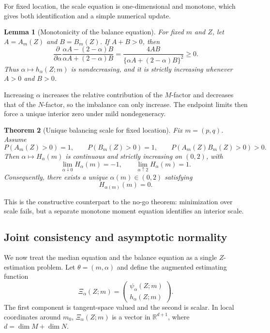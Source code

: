 \documentclass[11pt]{article}
\newtheorem{theorem}{Theorem}
\newtheorem{lemma}[theorem]{Lemma}
\newcommand{\R}{\mathbb R}
\newcommand{\1}{\mathbf{1}}
\begin{document}
For fixed location, the scale equation is one-dimensional and monotone, which
gives both identification and a simple numerical update.

\begin{lemma}[Monotonicity of the balance equation]\label{lem:h-monotone}
For fixed $m$ and $Z$, let $A=A_m(Z)$ and $B=B_m(Z)$.  If $A+B>0$, then
\begin{equation}\label{eq:h-derivative}
 \frac{\partial}{\partial\alpha}
 \frac{\alpha A-(2-\alpha)B}{\alpha A+(2-\alpha)B}
 =
 \frac{4AB}{\{\alpha A+(2-\alpha)B\}^2}\ge0.
\end{equation}
Thus $\alpha\mapsto h_\alpha(Z;m)$ is nondecreasing, and it is strictly increasing whenever $A>0$ and $B>0$.
\end{lemma}
Increasing $\alpha$ increases the relative contribution of the $M$-factor and
decreases that of the $N$-factor, so the imbalance can only increase. The endpoint limits then force a unique interior zero under mild
nondegeneracy.
\begin{theorem}[Unique balancing scale for fixed location]\label{thm:unique-balance-fixed-m}
Fix $m=(p,q)$.  Assume
\[
 P(A_m(Z)>0)=1,
 \qquad
 P(B_m(Z)>0)=1,
 \qquad
 P(A_m(Z)B_m(Z)>0)>0.
\]
Then $\alpha\mapsto H_\alpha(m)$ is continuous and strictly increasing on $(0,2)$, with
\[
 \lim_{\alpha\downarrow0}H_\alpha(m)=-1,
 \qquad
 \lim_{\alpha\uparrow2}H_\alpha(m)=1.
\]
Consequently, there exists a unique $\alpha(m)\in(0,2)$ satisfying
\[
 H_{\alpha(m)}(m)=0.
\]
\end{theorem}

This is the constructive counterpart to the no-go theorem: minimization over
scale fails, but a separate monotone moment equation identifies an interior
scale.

\subsection{Joint consistency and asymptotic normality}

We now treat the median equation and the balance equation as a single
$Z$-estimation problem.  Let $\theta=(m,\alpha)$ and define the augmented
estimating function
\begin{equation}\label{eq:Xi}
 \Xi_\alpha(Z;m)
 =
 \begin{pmatrix}
 \psi_\alpha(Z;m)\\
 h_\alpha(Z;m)
 \end{pmatrix}.
\end{equation}
The first component is tangent-space valued and the second is scalar.  In local coordinates around $m_0$, $\Xi_\alpha(Z;m)$ is a vector in $\R^{d+1}$, where $d=\dim M+\dim N$.
\end{document}
